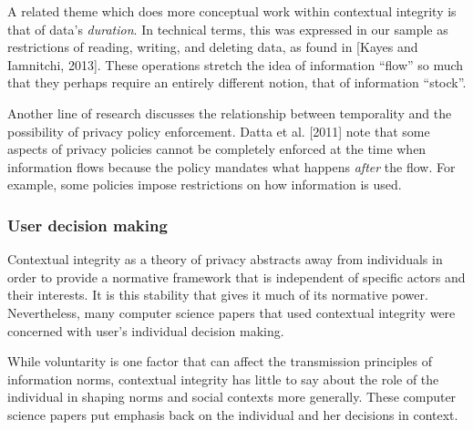 \documentclass[../thesis.tex]{subfiles}
\begin{document}
A related theme which does more conceptual work within contextual
integrity is that of data's \textit{duration}. In
technical terms, this was expressed in our sample as restrictions of
reading, writing, and deleting data, as found in [Kayes and Iamnitchi,
2013]. These operations stretch the idea of information
``flow'' so much that they perhaps
require an entirely different notion, that of information
``stock''.

Another line of research discusses the relationship between temporality
and the possibility of privacy policy enforcement. Datta et al. [2011]
note that some aspects of privacy policies cannot be completely
enforced at the time when information flows because the policy mandates
what happens \textit{after} the flow. For example, some policies impose
restrictions on how information is used.

\subsubsection{User decision making}
\label{CI4.4.4}

Contextual integrity as a theory of privacy abstracts away from
individuals in order to provide a normative framework that is
independent of specific actors and their interests. It is this
stability that gives it much of its normative power. Nevertheless, many
computer science papers that used contextual integrity were concerned
with user's individual decision making.


While voluntarity is one factor that can affect the transmission
principles of information norms, contextual integrity has little to say
about the role of the individual in shaping norms and social contexts
more generally. These computer science papers put emphasis back on the
individual and her decisions in context.
\end{document}

